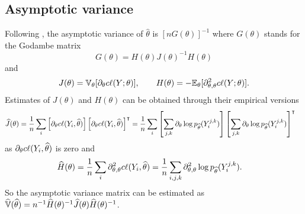 \subsection{Asymptotic variance}

Following \cite{VRF11}, the asymptotic variance of $\widehat{\theta}$ is $[n G(\theta)]^{-1}$
where $G(\theta)$ stands for the Godambe matrix 
$$
G(\theta) = H(\theta) J(\theta)^{-1} H(\theta)
$$
and
$$
J(\theta) = \mathbb V_\theta[\partial_\theta c\ell(Y; \theta)], 
\qquad
H(\theta) = -\mathbb E_\theta[\partial^2_{\theta, \theta} c\ell(Y; \theta)].
$$
Estimates of $J(\theta)$ and $H(\theta)$ can be obtained through their empirical versions
\begin{align*}
 \widehat{J}(\theta) 
 & = \frac1n \sum_i \left[\partial_\theta c\ell(Y_i, \widehat{\theta})\right] \left[\partial_\theta c\ell(Y_i, \widehat{\theta})\right]^\intercal 
 = \frac1n \sum_i \left[\sum_{j, k} \partial_\theta \log p_{\widehat{\theta}}(Y_i^{j, k})\right] \left[\sum_{j, k} \partial_\theta \log p_{\widehat{\theta}}(Y_i^{j, k})\right]^\intercal
\end{align*}
as $\partial_\theta c\ell(Y_i, \widehat{\theta})$ is zero and
\begin{align*}
 \widehat{H}(\theta) 
 & = \frac1n \sum_i \partial^2_{\theta, \theta} c\ell(Y_i, \widehat{\theta})
 = \frac1n \sum_{i, j, k} \partial^2_{\theta, \theta} \log p_{\widehat{\theta}}(Y_i^{j, k}).
\end{align*}
So the asymptotic variance matrix can be estimated as
$\widehat{\mathbb V}(\widehat{\theta}) = n^{-1} \widehat{H}(\theta)^{-1} \widehat{J}(\theta) \widehat{H}(\theta)^{-1}$.



